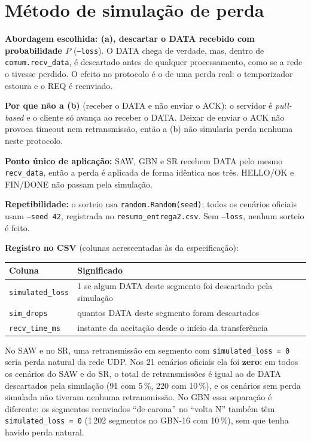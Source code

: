 \documentclass[11pt,a4paper]{article}
\newcommand{\cod}[1]{\textcolor{codverde}{\texttt{\small #1}}}
\begin{document}
\section{Método de simulação de perda}

\textbf{Abordagem escolhida: (a), descartar o DATA recebido com probabilidade $P$} (\cod{--loss}). O DATA chega de verdade, mas, dentro de \cod{comum.recv\_data}, é descartado antes de qualquer processamento, como se a rede o tivesse perdido. O efeito no protocolo é o de uma perda real: o temporizador estoura e o REQ é reenviado.

\textbf{Por que não a (b)} (receber o DATA e não enviar o ACK): o servidor é \emph{pull-based} e o cliente só avança ao receber o DATA. Deixar de enviar o ACK não provoca timeout nem retransmissão, então a (b) não simularia perda nenhuma neste protocolo.

\textbf{Ponto único de aplicação:} SAW, GBN e SR recebem DATA pelo mesmo \cod{recv\_data}, então a perda é aplicada de forma idêntica nos três. HELLO/OK e FIN/DONE não passam pela simulação.

\textbf{Repetibilidade:} o sorteio usa \cod{random.Random(seed)}; todos os cenários oficiais usam \cod{--seed 42}, registrada no \cod{resumo\_entrega2.csv}. Sem \cod{--loss}, nenhum sorteio é feito.

\textbf{Registro no CSV} (colunas acrescentadas às da especificação):

\begin{center}\small
\begin{tabular}{@{}l l@{}}
\toprule
\textbf{Coluna} & \textbf{Significado}\\
\midrule
\cod{simulated\_loss} & 1 se algum DATA deste segmento foi descartado pela simulação\\
\cod{sim\_drops} & quantos DATA deste segmento foram descartados\\
\cod{recv\_time\_ms} & instante da aceitação desde o início da transferência\\
\bottomrule
\end{tabular}
\end{center}

No SAW e no SR, uma retransmissão em segmento com \cod{simulated\_loss = 0} seria perda natural da rede UDP. Nos 21 cenários oficiais ela foi \textbf{zero}: em todos os cenários do SAW e do SR, o total de retransmissões é igual ao de DATA descartados pela simulação (91 com 5\,\%, 220 com 10\,\%), e os cenários sem perda simulada não tiveram nenhuma retransmissão. No GBN essa separação é diferente: os segmentos reenviados ``de carona'' no ``volta N'' também têm \cod{simulated\_loss = 0} (1\,202 segmentos no GBN-16 com 10\,\%), sem que tenha havido perda natural.
\end{document}
